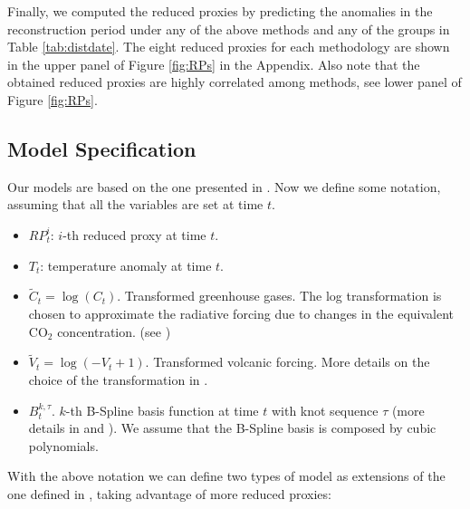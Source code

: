 \documentclass[11pt]{amsart}
\theoremstyle{plain}
\theoremstyle{definition}
\theoremstyle{remark}
\begin{document}
Finally, we computed the reduced proxies by predicting the anomalies in the
reconstruction period under any of the above methods and any of the groups in
Table \ref{tab:distdate}. The eight reduced proxies for each methodology are
shown in the upper panel of Figure \ref{fig:RPs} in the Appendix. Also note that
the obtained reduced proxies are highly correlated among methods, see lower
panel of Figure \ref{fig:RPs}.  

\subsection{Model Specification}
\label{sec:model}

Our models are based on the one presented in \cite{Barboza2014}. Now we define
some notation, assuming that all the variables are set at time $t$.
\begin{itemize}
\item $RP_t^i$: $i$-th reduced proxy at time $t$.
  
\item $T_t$: temperature anomaly at time $t$.
  
\item $\tilde C_t = \log (C_t)$. Transformed greenhouse gases. The log
  transformation is chosen to approximate the radiative forcing due to changes
  in the equivalent CO$_2$ concentration. (see \cite{Barboza2014})
  
\item $\tilde V_t = \log (-V_t+1)$. Transformed volcanic forcing. More details
  on the choice of the transformation in \cite{Barboza2014}.
  
\item $B_t^{k,\tau}$. $k$-th B-Spline basis function at time $t$ with knot
  sequence $\tau$ (more details in \cite{DeBoor2001} and \cite{Ramsay2005}). We assume that the
  B-Spline basis is composed by cubic polynomials.  
\end{itemize}
With the above notation we can define two types of model as extensions of the
one defined in \cite{Barboza2014}, taking advantage of more reduced proxies:
\end{document}
